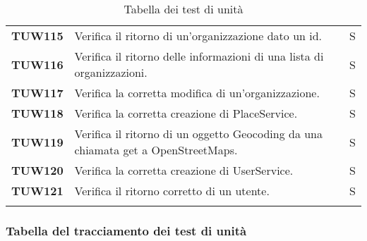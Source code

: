 \documentclass[../../piano-di-qualifica.tex]{subfiles}
\begin{document}
\begin{longtable}[H]{>{\centering\bfseries}m{3cm} >{}m{10cm} >{\centering\arraybackslash}m{3cm}}
TUW115             & Verifica il ritorno di un'organizzazione dato un id. & S \\

TUW116             & Verifica il ritorno delle informazioni di una lista di organizzazioni. & S \\

TUW117             & Verifica la corretta modifica di un'organizzazione. & S \\

TUW118             & Verifica la corretta creazione di PlaceService. & S \\

TUW119             & Verifica il ritorno di un oggetto Geocoding da una chiamata get a OpenStreetMaps. & S \\


TUW120             & Verifica la corretta creazione di UserService. & S \\

TUW121             & Verifica il ritorno corretto di un utente. & S \\

  \rowcolor{white}
  \caption{Tabella dei test di unità}%
  \label{tab:test_di_unita}
\end{longtable}


\subsubsection{Tabella del tracciamento dei test di unità}%
\label{subsub:tabella_tracciamento_test_di_unita}
\end{document}
